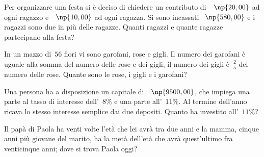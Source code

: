 \begin{multicols}{2}
\begin{esercizio}[\Ast]
\label{ese:16.98}
Per organizzare una festa si è deciso di chiedere un contributo di~\officialeuro~$\np{20,00}$ ad ogni ragazzo e~\officialeuro~$\np{10,00}$ ad ogni ragazza. Si sono incassati \officialeuro~$\np{580,00}$ e i ragazzi sono due in più delle ragazze. Quanti ragazzi e quante ragazze partecipano alla festa?
\end{esercizio}

\begin{esercizio}[\Ast]
\label{ese:16.99}
In un mazzo di~$56$ fiori vi sono garofani, rose e gigli. Il numero dei garofani è uguale alla somma del numero delle rose e dei gigli, il numero dei gigli è~$\frac{2}{5}$ del numero delle rose. Quante sono le rose, i gigli e i garofani?
\end{esercizio}

\begin{esercizio}[\Ast]
\label{ese:16.100}
Una persona ha a disposizione un capitale di~\officialeuro~$\np{9500,00}$, che impiega una parte al tasso di interesse dell'~$8\%$ e una parte all'~$11\%$. Al termine dell'anno ricava lo stesso interesse semplice dai due depositi. Quanto ha investito all'~$11\%$?
\end{esercizio}

\begin{esercizio}[\croce]
\label{ese:16.101}
Il papà di Paola ha venti volte l'età che lei avrà tra due anni e la mamma, cinque anni più giovane del marito, ha la metà dell'età che avrà quest'ultimo fra venticinque anni; dove si trova Paola oggi?
\end{esercizio}
\end{multicols}
